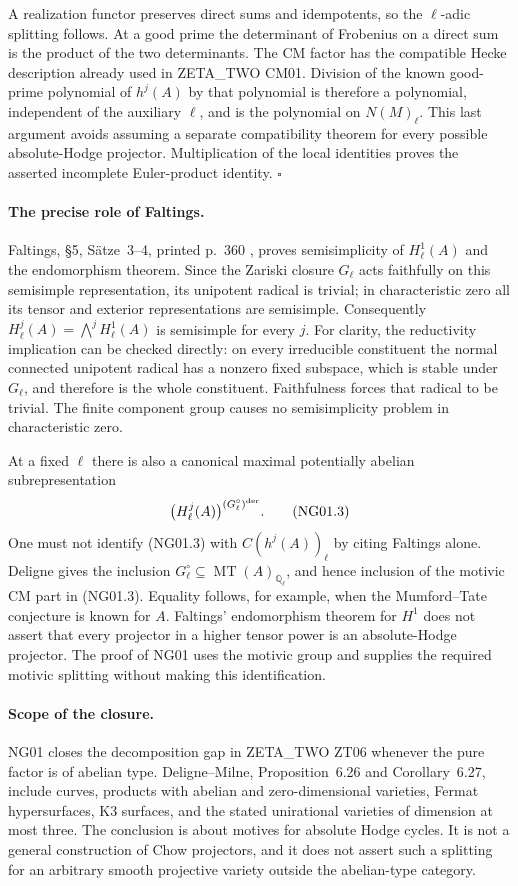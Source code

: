A realization functor preserves direct sums and idempotents, so the
$\ell$-adic splitting follows.  At a good prime the determinant of
Frobenius on a direct sum is the product of the two determinants.  The
CM factor has the compatible Hecke description already used in
ZETA\_TWO CM01.  Division of the known good-prime polynomial of $h^j(A)$
by that polynomial is therefore a polynomial, independent of the
auxiliary $\ell$, and is the polynomial on $N(M)_\ell$.  This last
argument avoids assuming a separate compatibility theorem for every
possible absolute-Hodge projector.  Multiplication of the local
identities proves the asserted incomplete Euler-product identity.
\hfill$\square$

\paragraph{The precise role of Faltings.}
Faltings, \S5, S\"atze~3--4, printed p.~360 \cite{NGFaltings}, proves semisimplicity of
$H^1_\ell(A)$ and the endomorphism theorem.  Since the Zariski closure
$G_\ell$ acts faithfully on this semisimple representation, its
unipotent radical is trivial; in characteristic zero all its tensor
and exterior representations are semisimple.  Consequently
$H^j_\ell(A)=\bigwedge^jH^1_\ell(A)$ is semisimple for every $j$.
For clarity, the reductivity implication can be checked directly:
on every irreducible constituent the normal connected unipotent
radical has a nonzero fixed subspace, which is stable under $G_\ell$,
and therefore is the whole constituent.  Faithfulness forces that
radical to be trivial.  The finite component group causes no
semisimplicity problem in characteristic zero.

At a fixed $\ell$ there is also a canonical maximal potentially
abelian subrepresentation
\[
 \bigl(H^j_\ell(A)\bigr)^{(G_\ell^\circ)^{\rm der}}.           \tag{NG01.3}
\]
One must not identify (NG01.3) with $C(h^j(A))_\ell$ by citing
Faltings alone.  Deligne gives the inclusion
$G_\ell^\circ\subseteq\operatorname{MT}(A)_{\mathbb Q_\ell}$,
and hence inclusion of the motivic CM part in (NG01.3).
Equality follows, for example, when the Mumford--Tate conjecture is
known for $A$.  Faltings' endomorphism theorem for $H^1$ does not assert
that every projector in a higher tensor power is an absolute-Hodge
projector.  The proof of NG01 uses the motivic group and supplies the
required motivic splitting without making this identification.

\paragraph{Scope of the closure.}
NG01 closes the decomposition gap in ZETA\_TWO ZT06 whenever the pure
factor is of abelian type.  Deligne--Milne, Proposition~6.26 and
Corollary~6.27,
include curves, products with abelian and zero-dimensional varieties,
Fermat hypersurfaces, K3 surfaces, and the stated unirational varieties
of dimension at most three.  The conclusion is about motives for
absolute Hodge cycles.  It is not a general construction of Chow
projectors, and it does not assert such a splitting for an arbitrary
smooth projective variety outside the abelian-type category.

